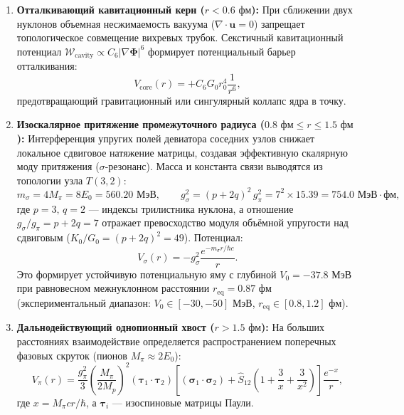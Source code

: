 \documentclass[11pt,a4paper]{article}
\theoremstyle{definition}
\theoremstyle{remark}
\begin{document}
\begin{enumerate}
    \item \textbf{Отталкивающий кавитационный керн ($r < 0.6\text{ фм}$):}
    При сближении двух нуклонов объемная несжимаемость вакуума ($\nabla \cdot \mathbf{u} = 0$) запрещает топологическое совмещение вихревых трубок. Секстичный кавитационный потенциал $\mathcal{W}_{\mathrm{cavity}} \propto C_6 |\nabla \boldsymbol{\Phi}|^6$ формирует потенциальный барьер отталкивания:
    \begin{equation}
        V_{\mathrm{core}}(r) = + C_6 G_0 r_0^4 \frac{1}{r^6},
        \label{eq:v_core_repulsive}
    \end{equation}
    предотвращающий гравитационный или сингулярный коллапс ядра в точку.
    
    \item \textbf{Изоскалярное притяжение промежуточного радиуса ($0.8\text{ фм} \le r \le 1.5\text{ фм}$):}
    Интерференция упругих полей девиатора соседних узлов снижает локальное сдвиговое натяжение матрицы, создавая эффективную скалярную моду притяжения ($\sigma$-резонанс). Масса и константа связи выводятся из топологии узла $T(3,2)$:
    \begin{equation}
        m_\sigma = 4M_\pi = 8E_0 = 560.20\text{ МэВ}, \qquad
        g_\sigma^2 = (p+2q)^2\, g_\pi^2 = 7^2 \times 15.39 = 754.0\text{ МэВ}\cdot\text{фм},
        \label{eq:sigma_mode_derived}
    \end{equation}
    где $p=3,\,q=2$ --- индексы трилистника нуклона, а отношение $g_\sigma/g_\pi = p+2q = 7$ отражает превосходство модуля объёмной упругости над сдвиговым ($K_0/G_0 = (p+2q)^2 = 49$). Потенциал:
    \begin{equation}
        V_\sigma(r) = - g_\sigma^2 \frac{e^{-m_\sigma r/\hbar c}}{r}.
    \end{equation}
    Это формирует устойчивую потенциальную яму с глубиной $V_0 = -37.8\text{ МэВ}$ при равновесном межнуклонном расстоянии $r_{\mathrm{eq}} = 0.87\text{ фм}$ (экспериментальный диапазон: $V_0 \in [-30,-50]\text{ МэВ}$, $r_{\mathrm{eq}} \in [0.8,1.2]\text{ фм}$).
    
    \item \textbf{Дальнодействующий однопионный хвост ($r > 1.5\text{ фм}$):}
    На больших расстояниях взаимодействие определяется распространением поперечных фазовых скруток (пионов $M_\pi \approx 2E_0$):
    \begin{equation}
        V_\pi(r) = \frac{g_\pi^2}{3} \left(\frac{M_\pi}{2M_p}\right)^2 (\boldsymbol{\tau}_1 \cdot \boldsymbol{\tau}_2) \left[ (\boldsymbol{\sigma}_1 \cdot \boldsymbol{\sigma}_2) + \hat{S}_{12} \left( 1 + \frac{3}{x} + \frac{3}{x^2} \right) \right] \frac{e^{-x}}{r},
    \end{equation}
    где $x = M_\pi c r / \hbar$, а $\boldsymbol{\tau}_i$ --- изоспиновые матрицы Паули.
\end{enumerate}
\end{document}
